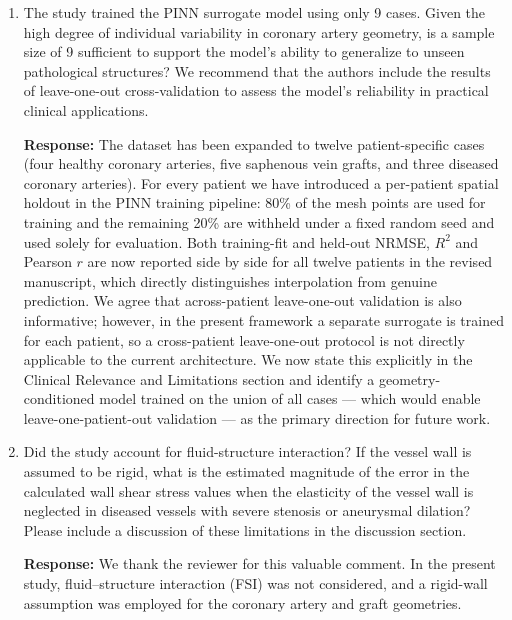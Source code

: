 \documentclass[11pt]{article}
\begin{document}
\begin{enumerate}[]
Therefore, the selected threshold was established based on the statistical behavior of the study dataset rather than being adopted directly from a single clinical reference.

    \item The study trained the PINN surrogate model using only 9 cases. Given the high degree of individual variability in coronary artery geometry, is a sample size of 9 sufficient to support the model's ability to generalize to unseen pathological structures? We recommend that the authors include the results of leave-one-out cross-validation to assess the model's reliability in practical clinical applications.

    \textbf{Response:} The dataset has been expanded to twelve patient-specific cases (four healthy coronary arteries, five saphenous vein grafts, and three diseased coronary arteries). For every patient we have introduced a per-patient spatial holdout in the PINN training pipeline: 80\% of the mesh points are used for training and the remaining 20\% are withheld under a fixed random seed and used solely for evaluation. Both training-fit and held-out NRMSE, $R^2$ and Pearson $r$ are now reported side by side for all twelve patients in the revised manuscript, which directly distinguishes interpolation from genuine prediction. We agree that across-patient leave-one-out validation is also informative; however, in the present framework a separate surrogate is trained for each patient, so a cross-patient leave-one-out protocol is not directly applicable to the current architecture. We now state this explicitly in the Clinical Relevance and Limitations section and identify a geometry-conditioned model trained on the union of all cases --- which would enable leave-one-patient-out validation --- as the primary direction for future work.

    \item Did the study account for fluid-structure interaction? If the vessel wall is assumed to be rigid, what is the estimated magnitude of the error in the calculated wall shear stress values when the elasticity of the vessel wall is neglected in diseased vessels with severe stenosis or aneurysmal dilation? Please include a discussion of these limitations in the discussion section.

    \textbf{Response:} We thank the reviewer for this valuable comment. In the present study, fluid–structure interaction (FSI) was not considered, and a rigid-wall assumption was employed for the coronary artery and graft geometries.


\end{enumerate}
\end{document}

